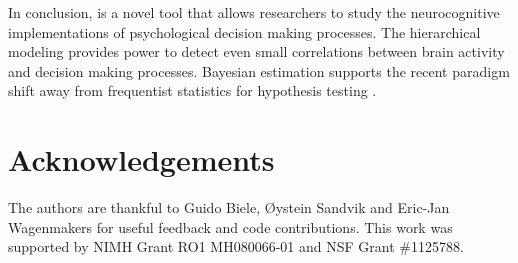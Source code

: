 \documentclass[letterpaper,10pt,english]{article}
\begin{document}
In conclusion,  is a novel tool that allows researchers to
study the neurocognitive implementations of psychological decision
making processes. The hierarchical modeling provides power to detect
even small correlations between brain activity and decision making
processes. Bayesian estimation supports the recent paradigm shift away
from frequentist statistics for hypothesis testing
\citep{Lindley65,Kruschke10,LeeWagenmakers13}.

\section*{Acknowledgements}
The authors are thankful to Guido Biele, Øystein Sandvik and Eric-Jan
Wagenmakers for useful feedback and code contributions. This work was
supported by NIMH Grant RO1 MH080066-01 and NSF Grant \#1125788.




\renewcommand{\indexname}{Index}
\printindex
\end{document}
